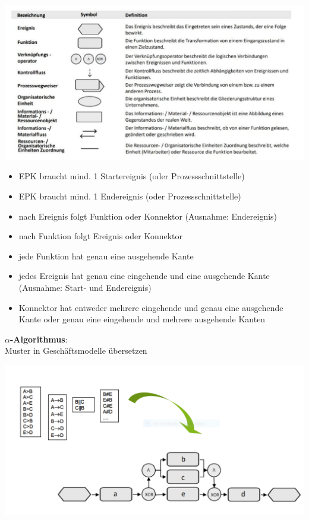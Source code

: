 \documentclass[a4]{scrartcl}
\begin{document}
\begin{center}
    \includegraphics[scale=0.9]{digi2.jpg}
\end{center}

\begin{itemize}
    \item EPK braucht mind. 1 Startereignis (oder Prozessschnittstelle)
    \item EPK braucht mind. 1 Endereignis (oder Prozessschnittstelle)
    \item nach Ereignis folgt Funktion oder Konnektor (Ausnahme: Endereignis)
    \item nach Funktion folgt Ereignis oder Konnektor
    \item jede Funktion hat genau eine ausgehende Kante
    \item jedes Ereignis hat genau eine eingehende und eine ausgehende Kante (Ausnahme: Start- und Endereignis)
    \item Konnektor hat entweder mehrere eingehende und genau eine ausgehende Kante oder genau eine eingehende und mehrere ausgehende Kanten
\end{itemize}

\newpage

\textbf{$\alpha$-Algorithmus}: \\

Muster in Geschäftsmodelle übersetzen

\begin{center}
    \includegraphics[scale=0.7]{digi3.png}
\end{center}
\end{document}
